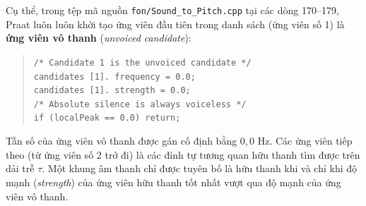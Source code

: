 Cụ thể, trong tệp mã nguồn \texttt{fon/Sound\_to\_Pitch.cpp} tại các dòng 170--179, Praat luôn luôn khởi tạo ứng viên đầu tiên trong danh sách (ứng viên số 1) là \textbf{ứng viên vô thanh} (\emph{unvoiced candidate}):
\begin{quote}
\small
\texttt{/* Candidate 1 is the unvoiced candidate */}\\
\texttt{candidates [1]. frequency = 0.0;}\\
\texttt{candidates [1]. strength = 0.0;}\\
\texttt{/* Absolute silence is always voiceless */}\\
\texttt{if (localPeak == 0.0) return;}
\end{quote}
Tần số của ứng viên vô thanh được gán cố định bằng $0{,}0\text{ Hz}$. Các ứng viên tiếp theo (từ ứng viên số 2 trở đi) là các đỉnh tự tương quan hữu thanh tìm được trên dải trễ $\tau$. Một khung âm thanh chỉ được tuyên bố là hữu thanh khi và chỉ khi độ mạnh (\emph{strength}) của ứng viên hữu thanh tốt nhất vượt qua độ mạnh của ứng viên vô thanh.

